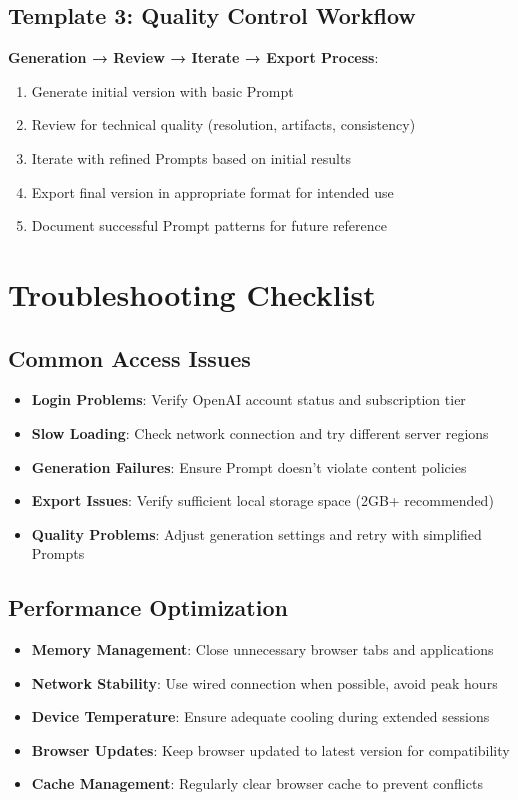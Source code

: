 \subsection*{Template 3: Quality Control Workflow}
\begin{Prompt}
\textbf{Generation → Review → Iterate → Export Process}:
\begin{enumerate}
\item Generate initial version with basic Prompt
\item Review for technical quality (resolution, artifacts, consistency)
\item Iterate with refined Prompts based on initial results
\item Export final version in appropriate format for intended use
\item Document successful Prompt patterns for future reference
\end{enumerate}
\end{Prompt}

\section*{Troubleshooting Checklist}

\subsection*{Common Access Issues}
\begin{itemize}
\item[$\square$] \textbf{Login Problems}: Verify OpenAI account status and subscription tier
\item[$\square$] \textbf{Slow Loading}: Check network connection and try different server regions
\item[$\square$] \textbf{Generation Failures}: Ensure Prompt doesn't violate content policies
\item[$\square$] \textbf{Export Issues}: Verify sufficient local storage space (2GB+ recommended)
\item[$\square$] \textbf{Quality Problems}: Adjust generation settings and retry with simplified Prompts
\end{itemize}

\subsection*{Performance Optimization}
\begin{itemize}
\item[$\square$] \textbf{Memory Management}: Close unnecessary browser tabs and applications
\item[$\square$] \textbf{Network Stability}: Use wired connection when possible, avoid peak hours
\item[$\square$] \textbf{Device Temperature}: Ensure adequate cooling during extended sessions
\item[$\square$] \textbf{Browser Updates}: Keep browser updated to latest version for compatibility
\item[$\square$] \textbf{Cache Management}: Regularly clear browser cache to prevent conflicts
\end{itemize}


